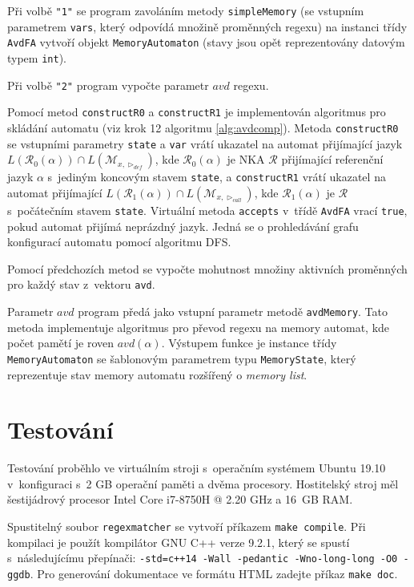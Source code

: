 \documentclass[thesis=B,czech]{FITthesis}[2019/12/23]
\theoremstyle{definition}
\begin{document}
Při volbě \texttt{"1"} se program zavoláním metody \texttt{simpleMemory} (se vstupním parametrem \texttt{vars}, který odpovídá množině proměnných regexu) na instanci třídy \texttt{AvdFA} vytvoří objekt \texttt{MemoryAutomaton} (stavy jsou opět reprezentovány datovým typem \texttt{int}).

Při volbě \texttt{"2"} program vypočte parametr $avd$ regexu.

Pomocí metod \texttt{constructR0} a \texttt{constructR1} je implementován algoritmus pro skládání automatu (viz krok 12 algoritmu \ref{alg:avdcomp}). Metoda \texttt{constructR0} se vstupními parametry \texttt{state} a \texttt{var} vrátí ukazatel na automat přijímající jazyk $L(\mathcal{R}_0(\alpha))\cap L(\mathcal{M}_{x, \triangleright_{def}})$, kde $\mathcal{R}_0(\alpha)$ je NKA $\mathcal{R}$ přijímající referenční jazyk $\alpha$ s~jediným koncovým stavem \texttt{state}, a \texttt{constructR1} vrátí ukazatel na automat přijímající $L(\mathcal{R}_1(\alpha))\cap L(\mathcal{M}_{x, \triangleright_{call}})$, kde $\mathcal{R}_1(\alpha)$ je $\mathcal{R}$ s~počátečním stavem \texttt{state}. Virtuální metoda \texttt{accepts} v~třídě \texttt{AvdFA} vrací \texttt{true}, pokud automat přijímá neprázdný jazyk. Jedná se o prohledávání grafu konfigurací automatu pomocí algoritmu DFS.

Pomocí předchozích metod se vypočte mohutnost množiny aktivních proměnných pro každý stav z~vektoru \texttt{avd}. 

Parametr $avd$ program předá jako vstupní parametr metodě \texttt{avdMemory}. Tato metoda implementuje algoritmus pro převod regexu na memory automat, kde počet pamětí je roven  $avd(\alpha)$. Výstupem funkce je instance třídy \texttt{MemoryAutomaton} se šablonovým parametrem typu \texttt{MemoryState}, který reprezentuje stav memory automatu rozšířený o \emph{memory list}.

\chapter{Testování}

Testování proběhlo ve virtuálním stroji s~operačním systémem Ubuntu 19.10 v~konfiguraci s~2 GB operační paměti a dvěma procesory. 
Hostitelský stroj měl šestijádrový procesor Intel Core i7-8750H @ 2.20 GHz a 16~GB RAM.

Spustitelný soubor \texttt{regexmatcher} se vytvoří příkazem \texttt{make compile}. Při kompilaci je použít kompilátor GNU C++ verze 9.2.1, který se spustí s~následujícímu přepínači: \texttt{-std=c++14 -Wall -pedantic -Wno-long-long -O0 -ggdb}. Pro generování dokumentace ve formátu HTML zadejte příkaz \texttt{make doc}.
\end{document}
